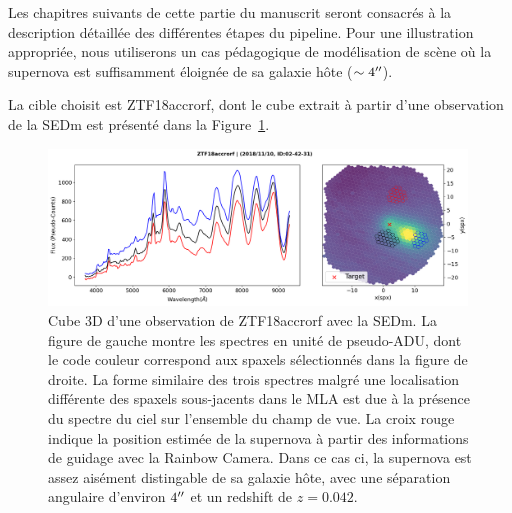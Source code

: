 \documentclass[../main/main.tex]{subfiles}
\begin{document}
Les chapitres suivants de cette partie du manuscrit seront consacrés à
la description détaillée des différentes étapes du pipeline. Pour une illustration
appropriée, nous utiliserons un cas pédagogique de modélisation de scène
où la supernova est suffisamment éloignée de sa galaxie hôte ($\sim4^{\prime\prime}$).

La cible choisit est ZTF18accrorf, dont le cube extrait à partir d'une
observation de la SEDm est présenté dans la
Figure~\ref{fig:easycasesedm}.

\begin{figure}[ht]
  \centering
  \includegraphics[width=0.99\textwidth]{../figures/04_hypergal/e3dcube_ZTF18accrorf.png}
  \caption[Cube 3D SEDm de ZTF18accrorf]{Cube 3D d'une observation de
    ZTF18accrorf avec la SEDm. La figure de gauche montre les spectres
    en unité de pseudo-ADU, dont le code couleur correspond aux spaxels
    sélectionnés dans la figure de droite. La forme similaire des trois
    spectres malgré une localisation différente des spaxels sous-jacents dans le MLA est due à la
    présence du spectre du ciel sur l'ensemble du champ de vue. La croix rouge indique la
    position estimée de la supernova à partir des informations de
    guidage avec la Rainbow Camera. Dans ce cas ci, la supernova est
    assez aisément distingable de sa galaxie hôte, avec une séparation
    angulaire d'environ $4^{\prime\prime}$ et un redshift de $z=0.042$.}
  \label{fig:easycasesedm}
\end{figure}
\end{document}
